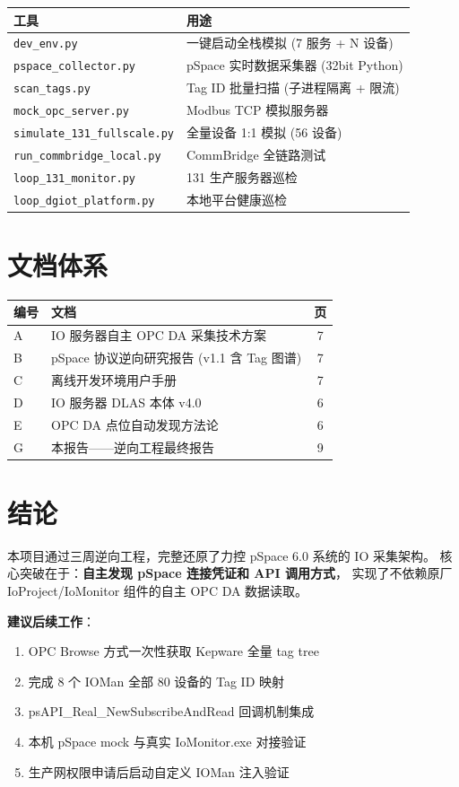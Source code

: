 \documentclass[12pt,a4paper]{ctexart}
\begin{document}
\begin{table}[H]\centering
\begin{tabular}{lp{8cm}}
\toprule
\textbf{工具} & \textbf{用途} \\
\midrule
\texttt{dev\_env.py} & 一键启动全栈模拟 (7 服务 + N 设备) \\
\texttt{pspace\_collector.py} & pSpace 实时数据采集器 (32bit Python) \\
\texttt{scan\_tags.py} & Tag ID 批量扫描 (子进程隔离 + 限流) \\
\texttt{mock\_opc\_server.py} & Modbus TCP 模拟服务器 \\
\texttt{simulate\_131\_fullscale.py} & 全量设备 1:1 模拟 (56 设备) \\
\texttt{run\_commbridge\_local.py} & CommBridge 全链路测试 \\
\texttt{loop\_131\_monitor.py} & 131 生产服务器巡检 \\
\texttt{loop\_dgiot\_platform.py} & 本地平台健康巡检 \\
\bottomrule
\end{tabular}
\end{table}

\section{文档体系}

\begin{table}[H]\centering
\begin{tabular}{llc}
\toprule
\textbf{编号} & \textbf{文档} & \textbf{页} \\
\midrule
A & IO 服务器自主 OPC DA 采集技术方案 & 7 \\
B & pSpace 协议逆向研究报告 (v1.1 含 Tag 图谱) & 7 \\
C & 离线开发环境用户手册 & 7 \\
D & IO 服务器 DLAS 本体 v4.0 & 6 \\
E & OPC DA 点位自动发现方法论 & 6 \\
G & 本报告——逆向工程最终报告 & 9 \\
\bottomrule
\end{tabular}
\end{table}

\section{结论}

本项目通过三周逆向工程，完整还原了力控 pSpace 6.0 系统的 IO 采集架构。
核心突破在于：\textbf{自主发现 pSpace 连接凭证和 API 调用方式}，
实现了不依赖原厂 IoProject/IoMonitor 组件的自主 OPC DA 数据读取。

\textbf{建议后续工作}：
\begin{enumerate}[leftmargin=*]
  \item OPC Browse 方式一次性获取 Kepware 全量 tag tree
  \item 完成 8 个 IOMan 全部 80 设备的 Tag ID 映射
  \item psAPI\_Real\_NewSubscribeAndRead 回调机制集成
  \item 本机 pSpace mock 与真实 IoMonitor.exe 对接验证
  \item 生产网权限申请后启动自定义 IOMan 注入验证
\end{enumerate}
\end{document}
